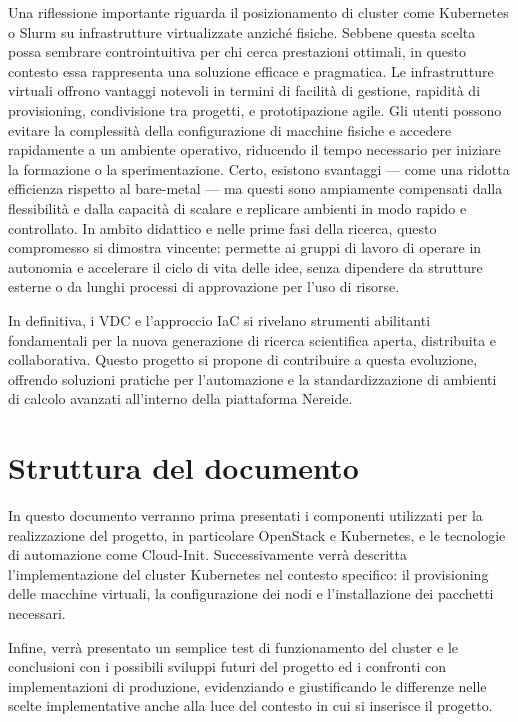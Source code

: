 \documentclass[12pt,a4paper,openright,twoside]{book}
\begin{document}
Una riflessione importante riguarda il posizionamento di cluster come Kubernetes o Slurm su infrastrutture virtualizzate anziché fisiche.
Sebbene questa scelta possa sembrare controintuitiva per chi cerca prestazioni ottimali, in questo contesto essa rappresenta una soluzione efficace e pragmatica.
Le infrastrutture virtuali offrono vantaggi notevoli in termini di facilità di gestione, rapidità di provisioning, condivisione tra progetti, e prototipazione agile.
Gli utenti possono evitare la complessità della configurazione di macchine fisiche e accedere rapidamente a un ambiente operativo, riducendo il tempo necessario per iniziare la formazione o la sperimentazione.
Certo, esistono svantaggi — come una ridotta efficienza rispetto al bare-metal — ma questi sono ampiamente compensati dalla flessibilità e dalla capacità di scalare e replicare ambienti in modo rapido e controllato.
In ambito didattico e nelle prime fasi della ricerca, questo compromesso si dimostra vincente: permette ai gruppi di lavoro di operare in autonomia e accelerare il ciclo di vita delle idee, senza dipendere da strutture
esterne o da lunghi processi di approvazione per l'uso di risorse.

In definitiva, i VDC e l'approccio IaC si rivelano strumenti abilitanti fondamentali per la nuova generazione di ricerca scientifica aperta, distribuita e collaborativa.
Questo progetto si propone di contribuire a questa evoluzione, offrendo soluzioni pratiche per l'automazione e la standardizzazione di ambienti di calcolo avanzati all'interno della piattaforma Nereide.

\section{Struttura del documento}
In questo documento verranno prima presentati i componenti utilizzati per la realizzazione del progetto, in particolare OpenStack e Kubernetes, e le tecnologie di automazione come Cloud-Init.
Successivamente verrà descritta l'implementazione del cluster Kubernetes nel contesto specifico: il provisioning delle macchine virtuali, la configurazione dei nodi e l'installazione dei pacchetti necessari.

Infine, verrà presentato un semplice test di funzionamento del cluster e le conclusioni con i possibili sviluppi futuri del progetto ed i confronti con implementazioni di produzione, evidenziando e giustificando
le differenze nelle scelte implementative anche alla luce del contesto in cui si inserisce il progetto.
\end{document}
